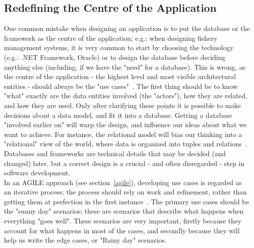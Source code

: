 \documentclass[11pt]{article} %
\begin{document}
\subsection{Redefining the Centre of the Application}\label{nodb}
One common mistake when designing an application is to put the database or the framework as the centre of the application; e.g.: when designing fishery management systems, it is very common to start by choosing the technology (e.g.: .NET Framework, Oracle) or to design the database before deciding anything else (including, if we have the "need" for a database). This is wrong, as the centre of the application - the highest level and most visible architectural entities - should always be the "use cases"~\cite{unclebob}. The first thing should be to know "what" exactly are the data entities involved (the "actors"), how they are related, and how they are used. Only after clarifying these points it is possible to make decisions about a data model, and fit it into a database. Getting a database "involved earlier on" will warp the design, and influence our ideas about what we want to achieve. For instance, the relational model will bias our thinking into a "relational" view of the world, where data is organized 
into 
tuples and relations~\cite{relational}.\\
Databases and frameworks are technical details that may be decided (and changed) later, but a correct design is a crucial - and often disregarded - step in software development.\\
In an AGILE approach (see section~\ref{agile}), developing use cases is regarded as an iterative process; the process should rely on work and refinement, rather than getting them at perfection in the first instance~\cite{usecases}. The primary use cases should be the "sunny day" scenarios; these are scenarios that describe what happens when everything "goes well". These scenarios are very important, firstly because they account for what happens in most of the cases, and secondly because they will help us write the edge cases, or "Rainy day" scenarios.\\
\end{document}
